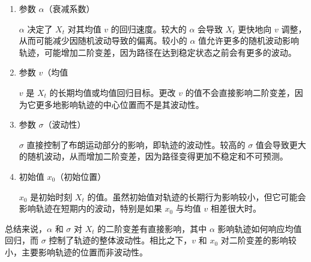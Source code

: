 \documentclass[12pt,a4paper]{article}
\begin{document}
\begin{enumerate}
    \item 参数 \( \alpha \)（衰减系数）
    \par \( \alpha \) 决定了 \( X_t \) 对其均值 \( v \) 的回归速度。较大的 \( \alpha \) 会导致 \( X_t \) 更快地向 \( v \) 调整，从而可能减少因随机波动导致的偏离。较小的 \( \alpha \) 值允许更多的随机波动影响轨迹，可能增加二阶变差，因为路径在达到稳定状态之前会有更多的波动。
    \item 参数 \( v \)（均值
    \par \( v \) 是 \( X_t \) 的长期均值或均值回归目标。更改 \( v \) 的值不会直接影响二阶变差，因为它更多地影响轨迹的中心位置而不是其波动性。

    \item 参数 \( \sigma \)（波动性）
    \par \( \sigma \) 直接控制了布朗运动部分的影响，即轨迹的波动性。较高的 \( \sigma \) 值会导致更大的随机波动，从而增加二阶变差，因为路径变得更加不稳定和不可预测。

    \item 初始值 \( x_0 \)（初始位置）
    \par \( x_0 \) 是初始时刻 \( X_t \) 的值。虽然初始值对轨迹的长期行为影响较小，但它可能会影响轨迹在短期内的波动，特别是如果 \( x_0 \) 与均值 \( v \) 相差很大时。

\end{enumerate}

总结来说，\( \alpha \) 和 \( \sigma \) 对 \( X_t \) 的二阶变差有直接影响，其中 \( \alpha \) 影响轨迹如何响应均值回归，而 \( \sigma \) 控制了轨迹的整体波动性。相比之下，\( v \) 和 \( x_0 \) 对二阶变差的影响较小，主要影响轨迹的位置而非波动性。
\end{document}
